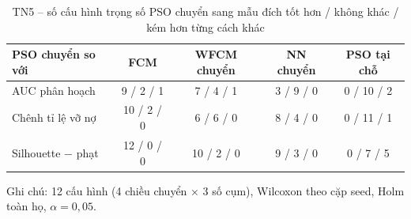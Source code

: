 \begin{table}[htbp]
\centering
\caption{TN5 -- số cấu hình trọng số PSO chuyển sang mẫu đích tốt hơn / không khác / kém hơn từng cách khác}
\label{tab:e10-tong-hop}
\footnotesize
\setlength{\tabcolsep}{3pt}
\begin{tabular}{@{}lcccc@{}}
\toprule
PSO chuyển so với & FCM & WFCM chuyển & NN chuyển & PSO tại chỗ \\
\midrule
AUC phân hoạch & 9 / 2 / 1 & 7 / 4 / 1 & 3 / 9 / 0 & 0 / 10 / 2 \\
Chênh tỉ lệ vỡ nợ & 10 / 2 / 0 & 6 / 6 / 0 & 8 / 4 / 0 & 0 / 11 / 1 \\
Silhouette − phạt & 12 / 0 / 0 & 10 / 2 / 0 & 9 / 3 / 0 & 0 / 7 / 5 \\
\bottomrule
\end{tabular}
\par\smallskip\parbox{\linewidth}{\scriptsize Ghi chú: 12 cấu hình (4 chiều chuyển × 3 số cụm), Wilcoxon theo cặp seed, Holm toàn họ, $\alpha = 0{,}05$.}
\end{table}
